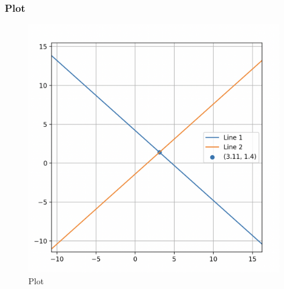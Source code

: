 \documentclass{beamer}
\begin{document}
\begin{frame}[fragile]
\frametitle{Plot}

\begin{figure}[H]
    \centering
    \includegraphics[width=0.7\columnwidth]{Figs/527.png}
    \caption{Plot}
    \label{fig:placeholder}
\end{figure}

\end{frame}
\end{document}
